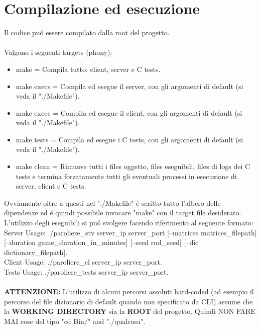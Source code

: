 \chapter{Compilazione ed esecuzione}

Il codice pu\'o essere compilato dalla root del progetto.
\\
\\
Valgono i seguenti targets (phony):

\begin{itemize}
\item make = Compila tutto: client, server e C tests.
\item make execs = Compila ed esegue il server, con gli argomenti di default (si veda il "./Makefile").
\item make execc = Compila ed esegue il client, con gli argomenti di default (si veda il "./Makefile").
\item make tests = Compila ed esegue i C tests, con gli argomenti di default (si veda il "./Makefile").
\item make clean = Rimuove tutti i files oggetto, files eseguibili, files di logs dei C tests e termina forzatamente tutti gli eventuali processi in esecuzione di server, client e C tests.
\end{itemize}
\leavevmode 
Ovviamente oltre a questi nel "./Makefile" \'e scritto tutto l'albero delle dipendenze ed \'e quindi possibile invocare "make" con il target file desiderato.
\\
L'utilizzo degli eseguibili si pu\'o svolgere facendo riferimento al seguente formato:
\\
Server Usage: ./paroliere\_srv server\_ip server\_port [--matrices matrices\_filepath] [--duration game\_duration\_in\_minutes] [--seed rnd\_seed] [--dic dictionary\_filepath].
\\
Client Usage: ./paroliere\_cl server\_ip server\_port.
\\
Tests Usage: ./paroliere\_tests server\_ip server\_port.
\\
\\
\textbf{ATTENZIONE:} L'utilizzo di alcuni percorsi assoluti hard-coded (ad esempio il percorso del file dizionario di default quando non specificato da CLI) assume che la \textbf{WORKING DIRECTORY} sia la \textbf{ROOT} del progetto. Quindi NON FARE MAI cose del tipo "cd Bin/" and "./qualcosa".
